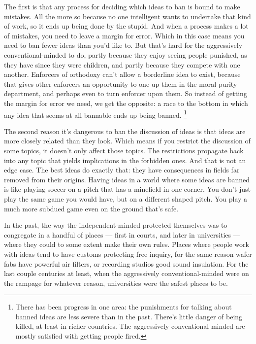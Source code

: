 The first is that any process for deciding which ideas to ban is bound
to make mistakes. All the more so because no one intelligent wants to
undertake that kind of work, so it ends up being done by the stupid. And
when a process makes a lot of mistakes, you need to leave a margin for
error. Which in this case means you need to ban fewer ideas than you'd
like to. But that's hard for the aggressively conventional-minded to do,
partly because they enjoy seeing people punished, as they have since
they were children, and partly because they compete with one another.
Enforcers of orthodoxy can't allow a borderline idea to exist, because
that gives other enforcers an opportunity to one-up them in the moral
purity department, and perhaps even to turn enforcer upon them. So
instead of getting the margin for error we need, we get the opposite: a
race to the bottom in which any idea that seems at all bannable ends up
being banned. \footnote{There has been progress in one area: the punishments for talking
about banned ideas are less severe than in the past. There's little
danger of being killed, at least in richer countries. The aggressively
conventional-minded are mostly satisfied with getting people fired.}

The second reason it's dangerous to ban the discussion of ideas is that
ideas are more closely related than they look. Which means if you
restrict the discussion of some topics, it doesn't only affect those
topics. The restrictions propagate back into any topic that yields
implications in the forbidden ones. And that is not an edge case. The
best ideas do exactly that: they have consequences in fields far removed
from their origins. Having ideas in a world where some ideas are banned
is like playing soccer on a pitch that has a minefield in one corner.
You don't just play the same game you would have, but on a different
shaped pitch. You play a much more subdued game even on the ground
that's safe.

In the past, the way the independent-minded protected themselves was to
congregate in a handful of places --- first in courts, and later in
universities --- where they could to some extent make their own rules.
Places where people work with ideas tend to have customs protecting free
inquiry, for the same reason wafer fabs have powerful air filters, or
recording studios good sound insulation. For the last couple centuries
at least, when the aggressively conventional-minded were on the rampage
for whatever reason, universities were the safest places to be.

